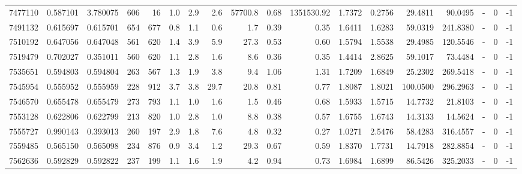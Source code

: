 \begin{tabular}{rrrrrrrrrrrrrrrlrr}
   7477110 & 0.587101 &   3.780075 &  606 &   16 &      1.0 &      2.9 &     2.6 &  57700.8 &       0.68 &  1351530.92 &  1.7372 &  0.2756 &   29.4811 &   90.0495 &             - &        0 &         -1 \\
   7491132 & 0.615697 &   0.615701 &  654 &  677 &      0.8 &      1.1 &     0.6 &      1.7 &       0.39 &        0.35 &  1.6411 &  1.6283 &   59.0319 &  241.8380 &             - &        0 &         -1 \\
   7510192 & 0.647056 &   0.647048 &  561 &  620 &      1.4 &      3.9 &     5.9 &     27.3 &       0.53 &        0.60 &  1.5794 &  1.5538 &   29.4985 &  120.5546 &             - &        0 &         -1 \\
   7519479 & 0.702027 &   0.351011 &  560 &  620 &      1.1 &      2.8 &     1.6 &      8.6 &       0.36 &        0.35 &  1.4414 &  2.8625 &   59.1017 &   73.4484 &             - &        0 &         -1 \\
   7535651 & 0.594803 &   0.594804 &  263 &  567 &      1.3 &      1.9 &     3.8 &      9.4 &       1.06 &        1.31 &  1.7209 &  1.6849 &   25.2302 &  269.5418 &             - &        0 &         -1 \\
   7545954 & 0.555952 &   0.555959 &  228 &  912 &      3.7 &      3.8 &    29.7 &     20.8 &       0.81 &        0.77 &  1.8087 &  1.8021 &  100.0500 &  296.2963 &             - &        0 &         -1 \\
   7546570 & 0.655478 &   0.655479 &  273 &  793 &      1.1 &      1.0 &     1.6 &      1.5 &       0.46 &        0.68 &  1.5933 &  1.5715 &   14.7732 &   21.8103 &             - &        0 &         -1 \\
   7553128 & 0.622806 &   0.622799 &  213 &  820 &      1.0 &      2.8 &     1.0 &      8.8 &       0.38 &        0.57 &  1.6755 &  1.6743 &   14.3133 &   14.5624 &             - &        0 &         -1 \\
   7555727 & 0.990143 &   0.393013 &  260 &  197 &      2.9 &      1.8 &     7.6 &      4.8 &       0.32 &        0.27 &  1.0271 &  2.5476 &   58.4283 &  316.4557 &             - &        0 &         -1 \\
   7559485 & 0.565150 &   0.565098 &  234 &  876 &      0.9 &      3.4 &     1.2 &     29.3 &       0.67 &        0.59 &  1.8370 &  1.7731 &   14.7918 &  282.8854 &             - &        0 &         -1 \\
   7562636 & 0.592829 &   0.592822 &  237 &  199 &      1.1 &      1.6 &     1.9 &      4.2 &       0.94 &        0.73 &  1.6984 &  1.6899 &   86.5426 &  325.2033 &             - &        0 &         -1 \\

\end{tabular}
